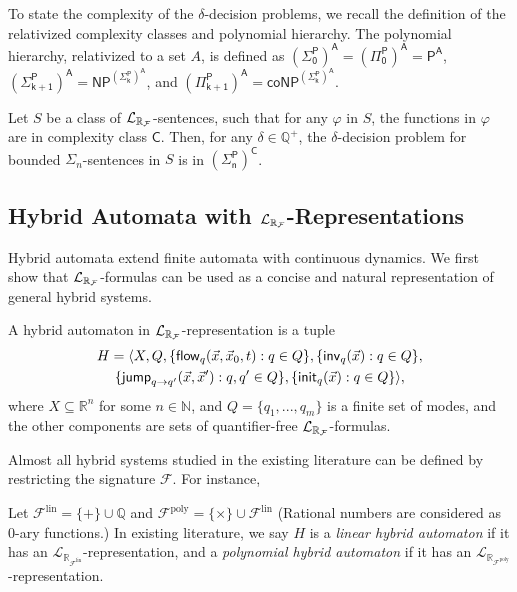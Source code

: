 \documentclass[12pt]{article}
\begin{document}
To state the complexity of the $\delta$-decision problems, we recall the definition of the relativized complexity classes and polynomial hierarchy. The polynomial hierarchy, relativized to a set $A$, is defined as $\mathsf{(\Sigma_0^P)^A= (\Pi_0^P)^A=P^A}$, $\mathsf{(\Sigma_{k+1}^P)^A= NP^{(\Sigma_k^P)^A}}$, and $\mathsf{(\Pi_{k+1}^P)^A=coNP^{(\Sigma_{k}^P)^A}}$.
\begin{theorem}\label{compmain}
Let $S$ be a class of $\mathcal{L}_{\mathbb{R}_{\mathcal{F}}}$-sentences, such that for any $\varphi$ in $S$, the functions in $\varphi$ are in complexity class $\mathsf{C}$. Then, for any $\delta\in \mathbb{Q}^+$, the $\delta$-decision problem for bounded $\Sigma_n$-sentences in $S$ is in $\mathsf{(\Sigma_n^P)^C}$.
\end{theorem}







\subsection{Hybrid Automata with {\large$\mathcal{L}_{\mathbb{R}_{\mathcal{F}}}$}-Representations}\label{language}

Hybrid automata extend finite automata with continuous dynamics. We first show that $\mathcal{L}_{\mathbb{R}_{\mathcal{F}}}$-formulas can be used as a concise and natural representation of general hybrid systems.

\begin{definition}\label{lrf-definition}
A hybrid automaton in $\mathcal{L}_{\mathbb{R}_{\mathcal{F}}}$-representation is a tuple
\begin{multline*}
H = \langle X, Q, \{{\mathsf{flow}}_q(\vec x, \vec x_0, t): q\in Q\},\{\mathsf{inv}_q(\vec x): q\in Q\},\\ \{\mathsf{jump}_{q\rightarrow q'}(\vec x, \vec x'): q,q'\in Q\}, \{\mathsf{init}_q(\vec x): q\in Q\}\rangle,
\end{multline*}
where $X\subseteq \mathbb{R}^n$ for some $n\in \mathbb{N}$, and $Q=\{q_1,...,q_m\}$ is a finite set of modes, and the other components are sets of quantifier-free $\mathcal{L}_{\mathbb{R}_{\mathcal{F}}}$-formulas.
\end{definition}

Almost all hybrid systems studied in the existing literature can be defined by restricting the signature $\mathcal{F}$. For instance,

\begin{example} Let $\mathcal{F}^{\mathrm{lin}} = \{+\}\cup \mathbb{Q}$ and $\mathcal{F}^{\mathrm{poly}}=\{\times\}\cup\mathcal{F}^{\mathrm{lin}}$ (Rational numbers are considered as 0-ary functions.) In existing literature, we say $H$ is a {\em linear hybrid automaton} if it has an $\mathcal{L}_{\mathbb{R}_{\mathcal{F}^{\mathrm{lin}}}}$-representation, and a {\em polynomial hybrid automaton} if it has an $\mathcal{L}_{\mathbb{R}_{\mathcal{F}^{\mathrm{poly}}}}$-representation.
\end{example}
\end{document}
